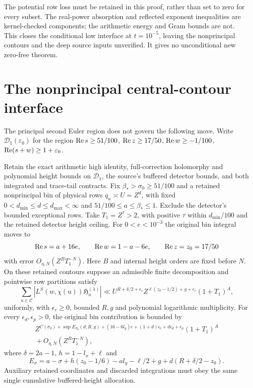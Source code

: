 The potential row loss must be retained in this proof, rather than
set to zero for every subset. The real-power absorption and reflected
exponent inequalities are kernel-checked components; the arithmetic
energy and Gram bounds are not. This closes the conditional low interface
at $t=10^{-5}$, leaving the nonprincipal contours and the deep source
inputs unverified. It gives no unconditional new zero-free theorem.


\section{The nonprincipal central-contour interface}
The principal second Euler region does not govern the following move.
Write $\mathcal D_1(\varepsilon_0)$ for the region
$\operatorname{Re} s\ge51/100$, $\operatorname{Re} z\ge17/50$, $\operatorname{Re} w\ge-1/100$,
$\operatorname{Re}(s+w)\ge1+\varepsilon_0$.
\begin{proposition}\label{prop:central}
Retain the exact arithmetic high identity, full-correction holomorphy and
polynomial height bounds on $\mathcal D_1$, the source's buffered detector
bounds, and both integrated and trace-tail contracts. Fix
$\beta_*>\sigma_0\ge51/100$ and a retained nonprincipal bin of physical
rows $q_u\asymp U=Z^d$, with fixed
$0<d_{\min}\le d\le d_{\max}<\infty$ and $51/100\le a\le\beta_*\le1$. Exclude the detector's bounded exceptional rows.
Take $T_1=Z^\tau>2$, with positive $\tau$ within $d_{\min}/100$
and the retained detector height ceiling.
For $0<e<10^{-3}$ the original bin integral moves to
\[
 \operatorname{Re} s=a+16e,\qquad\operatorname{Re} w=1-a-6e,\qquad\operatorname{Re} z=z_0=17/50
\]
with error $O_{\eta,N}(Z^BT_1^{-N})$. Here $B$ and internal height
orders are fixed before $N$. On these retained contours suppose an
admissible finite decomposition and pointwise row partitions satisfy
\[
 \sum_{u\in\mathcal C}|L^S(w,\chi(u))\mathfrak H_u^{(\lambda)}|
 \ll U^{R+\delta/2+\epsilon_c}
 Z^{\ell(z_0-1/2)+g+\epsilon_c}(1+T_1)^A,
\]
uniformly, with $\epsilon_c\ge0$, bounded $R,g$ and polynomial
logarithmic multiplicity. For every $\epsilon_d,\epsilon_p>0$,
the original bin contribution is bounded by
\[
 \begin{gathered}
 Z^{C(\sigma_0)+\sup E_{\sigma_0}(d;R,g)
 +(16-6l_y)e+(1+d)\epsilon_c+d\epsilon_d+\epsilon_p}(1+T_1)^A\\
 {}+O_{\eta,N}(Z^BT_1^{-N}),
 \end{gathered}
\]
where $\delta=2a-1$, $h=1-l_x+\ell$ and
\[
 E_\sigma=a-\sigma+h(z_0-1/6)-a l_y-\ell/2+g
               +d(R+\delta/2-z_0).
\]
Auxiliary retained coordinates and discarded integrations must obey the
same single cumulative buffered-height allocation.
\end{proposition}
